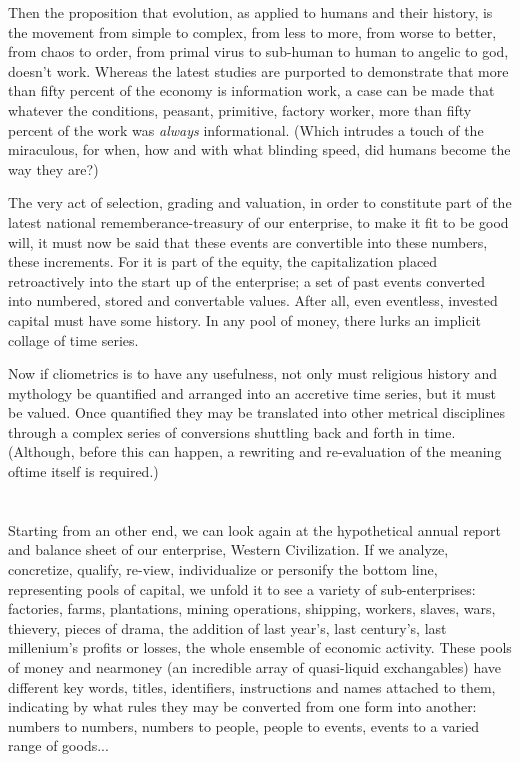 \documentclass[11pt,twoside,draft]{memoir}
\begin{document}
Then the proposition that evolution, as
applied to humans and their history, is the
movement from simple to complex, from
less to more, from worse to better, from chaos
to order, from primal virus to sub-human to
human to angelic to god, doesn't work.
Whereas the latest studies are purported to
demonstrate that more than fifty percent of
the economy is information work, a case can
be made that whatever the conditions, peasant, primitive,
factory worker, more than
fifty percent of the work was \emph{always} informational. (Which intrudes a touch of the
miraculous, for when, how and with what
blinding speed, did humans become the way
they are?)

The very act of selection, grading and
valuation, in order to constitute part of the
latest national rememberance-treasury of
our enterprise, to make it fit to be good will,
it must now be said that these events are
convertible into these numbers, these increments. For it is part of the equity, the capitalization placed retroactively into the start
up of the enterprise; a set of past events
converted into numbered, stored and convertable values. After all, even eventless,
invested capital must have some history. In
any pool of money, there lurks an implicit
collage of time series.

Now if cliometrics is to have any usefulness, not only must religious history and
mythology be quantified and arranged into
an accretive time series, but it must be valued. Once quantified they may be translated
into other metrical disciplines through a
complex series of conversions shuttling
back and forth in time. (Although, before
this can happen, a rewriting and re-evaluation of the meaning oftime itself is required.)

\chapter{}

Starting from an other end, we can look again at the hypothetical annual report and
balance sheet of our enterprise, Western Civilization. If we analyze, concretize, qualify, re-view, individualize or personify the
bottom line, representing pools of capital, we unfold it to see a variety of sub-enterprises: factories, farms, plantations, mining
operations, shipping, workers, slaves, wars, thievery, pieces of drama, the addition of last
year's, last century's, last millenium's profits or losses, the whole ensemble of economic
activity. These pools of money and nearmoney (an incredible array of quasi-liquid
exchangables) have different key words, titles, identifiers, instructions and names attached to them, indicating by what rules
they may be converted from one form into another: numbers
to numbers, numbers to people, people to events, events to a varied range of goods...
\end{document}

